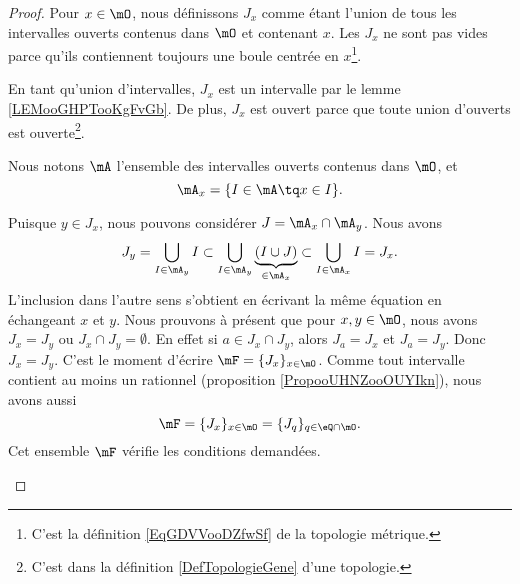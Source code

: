 \begin{proof}
	Pour \( x\in \mO\), nous définissons \( J_x\) comme étant l'union de tous les intervalles ouverts contenus dans \( \mO\) et contenant \( x\). Les \( J_x\) ne sont pas vides parce qu'ils contiennent toujours une boule centrée en \( x\)\footnote{C'est la définition \ref{EqGDVVooDZfwSf} de la topologie métrique.}.

	En tant qu'union d'intervalles, \( J_x\) est un intervalle par le lemme \ref{LEMooGHPTooKgFvGb}. De plus, \( J_x\) est ouvert parce que toute union d'ouverts est ouverte\footnote{C'est dans la définition \ref{DefTopologieGene} d'une topologie.}.

	Nous notons \( \mA\) l'ensemble des intervalles ouverts contenus dans \( \mO\), et
	\begin{equation}
		\mA_x=\{ I\in\mA\tq x\in I \}.
	\end{equation}

	\begin{subproof}
		\spitem[Si \( y\in J_x\), alors \( J_x=J_y\)]
		Puisque \( y\in J_x\), nous pouvons considérer \( J=\mA_x\cap \mA_y\). Nous avons
		\begin{equation}
			J_y=\bigcup_{I\in\mA_y}I\subset \bigcup_{I\in \mA_y}\underbrace{(I\cup J)}_{\in\mA_x}\subset \bigcup_{I\in\mA_x}I=J_x.
		\end{equation}
		L'inclusion dans l'autre sens s'obtient en écrivant la même équation en échangeant \( x\) et \( y\).
		Nous prouvons à présent que pour \( x,y\in \mO\), nous avons \( J_x=J_y \) ou \( J_x\cap J_y=\emptyset\). En effet si \( a\in J_x\cap J_y\), alors \( J_a=J_x\) et \( J_a=J_y\). Donc \( J_x=J_y\).
		\spitem[Dénombrable]
		C'est le moment d'écrire \( \mF=\{ J_x \}_{x\in \mO}\). Comme tout intervalle contient au moins un rationnel (proposition \ref{PropooUHNZooOUYIkn}), nous avons aussi
		\begin{equation}
			\mF=\{ J_x \}_{x\in \mO}=\{ J_q \}_{q\in \eQ\cap\mO}.
		\end{equation}
		Cet ensemble \( \mF\) vérifie les conditions demandées.
	\end{subproof}
\end{proof}
